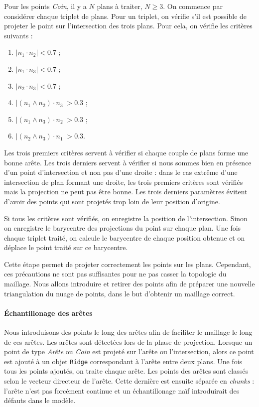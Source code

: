 ﻿\documentclass[12pt, twoside]{article}
\begin{document}
Pour les points \textit{Coin}, il y a $N$ plans à traiter, $N \geq 3$. On commence par considérer chaque triplet de plans. Pour un triplet, on vérifie s'il est possible de projeter le point sur l'intersection des trois plans. Pour cela, on vérifie les critères suivants :
\begin{enumerate}
  \item $\vert n_1 \cdot n_2 \vert < 0.7$ ;
  \item $\vert n_1 \cdot n_3 \vert < 0.7$ ;
  \item $\vert n_2 \cdot n_3 \vert < 0.7$ ;
  \item $\vert (n_1 \wedge n_2) \cdot n_3 \vert > 0.3$ ;
  \item $\vert (n_1 \wedge n_3) \cdot n_2 \vert > 0.3$ ;
  \item $\vert (n_2 \wedge n_3) \cdot n_1 \vert > 0.3$.
\end{enumerate}
Les trois premiers critères servent à vérifier si chaque couple de plans forme une bonne arête. Les trois derniers servent à vérifier si nous sommes bien en présence d'un point d'intersection et non pas d'une droite : dans le cas extrême d'une intersection de plan formant une droite, les trois premiers critères sont vérifiés mais la projection ne peut pas être bonne. Les trois derniers paramètres évitent d'avoir des points qui sont projetés trop loin de leur position d'origine.

Si tous les critères sont vérifiés, on enregistre la position de l'intersection. Sinon on enregistre le barycentre des projections du point sur chaque plan. Une fois chaque triplet traité, on calcule le barycentre de chaque position obtenue et on déplace le point traité sur ce barycentre.

Cette étape permet de projeter correctement les points sur les plans. Cependant, ces précautions ne sont pas suffisantes pour ne pas casser la topologie du maillage. Nous allons introduire et retirer des points afin de préparer une nouvelle triangulation du nuage de points, dans le but d'obtenir un maillage correct.

\paragraph{Échantillonage des arêtes} Nous introduisons des points le long des arêtes afin de faciliter le maillage le long de ces arêtes. Les arêtes sont détectées lors de la phase de projection. Lorsque un point de type \textit{Arête} ou \textit{Coin} est projeté sur l'arête ou l'intersection, alors ce point est ajouté à un objet \texttt{Ridge} correspondant à l'arête entre deux plans. Une fois tous les points ajoutés, on traite chaque arête. Les points des arêtes sont classés selon le vecteur directeur de l'arête. Cette dernière est ensuite séparée en \textit{chunks} : l'arête n'est pas forcément continue et un échantillonage naïf introduirait des défauts dans le modèle.
\end{document}
